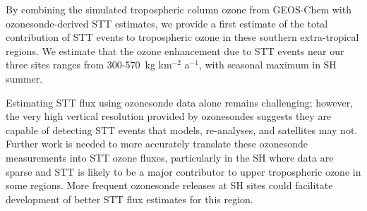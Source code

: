\documentclass[acp, manuscript]{copernicus} %
\begin{document}
By combining the simulated tropospheric column ozone from GEOS-Chem with ozonesonde-derived STT estimates, we provide a first estimate of the total contribution of STT events to tropospheric ozone in these southern extra-tropical regions.
We estimate that the ozone enhancement due to STT events near our three sites ranges from 300-570~kg km$^{-2}$ a$^{-1}$, with seasonal maximum in SH summer.

Estimating STT flux using ozonesonde data alone remains challenging; however, the very high vertical resolution provided by ozonesondes suggests  they are capable of detecting STT events that models, re-analyses, and satellites may not. 
Further work is needed to more accurately translate these ozonesonde measurements into STT ozone fluxes, particularly in the SH where data are sparse and STT is likely to be a major contributor to upper tropospheric ozone in some regions.
More frequent ozonesonde releases at SH sites could facilitate development of better STT flux estimates for this region.

\appendix

\appendixfigures  %
\appendixtables   %


\end{document}
